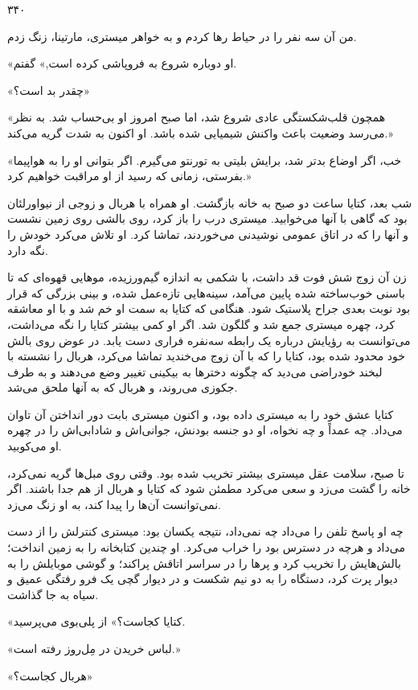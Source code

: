 ۳۴۰

من آن سه نفر را در حیاط رها کردم و به خواهر میستری، مارتینا، زنگ زدم.

«او دوباره شروع به فروپاشی کرده است,» گفتم.

«چقدر بد است؟»

«همچون قلب‌شکستگی عادی شروع شد، اما صبح امروز او بی‌حساب شد. به نظر می‌رسد وضعیت باعث واکنش شیمیایی شده باشد. او اکنون به شدت گریه می‌کند.»

«خب، اگر اوضاع بدتر شد، برایش بلیتی به تورنتو می‌گیرم. اگر بتوانی او را به هواپیما بفرستی، زمانی که رسید از او مراقبت خواهیم کرد.»

شب بعد، کتایا ساعت دو صبح به خانه بازگشت. او همراه با هربال و زوجی از نیواورلئان بود که گاهی با آنها می‌خوابید. میستری درب را باز کرد، روی بالشی روی زمین نشست و آنها را که در اتاق عمومی نوشیدنی می‌خوردند، تماشا کرد. او تلاش می‌کرد خودش را نگه دارد.

زن آن زوج شش فوت قد داشت، با شکمی به اندازه گیم‌ورزیده، موهایی قهوه‌ای که تا باسنی خوب‌ساخته شده پایین می‌آمد، سینه‌هایی تازه‌عمل شده، و بینی بزرگی که قرار بود نوبت بعدی جراح پلاستیک شود. هنگامی که کتایا به سمت او خم شد و با او معاشقه کرد، چهره میستری جمع شد و گلگون شد. اگر او کمی بیشتر کتایا را نگه می‌داشت، می‌توانست به رؤیایش درباره یک رابطه سه‌نفره فراری دست یابد. در عوض روی بالش خود محدود شده بود، کتایا را که با آن زوج می‌خندید تماشا می‌کرد، هربال را نشسته با لبخند خودراضی می‌دید که چگونه دخترها به بیکینی تغییر وضع می‌دهند و به طرف جکوزی می‌روند، و هربال که به آنها ملحق می‌شد.

کتایا عشق خود را به میستری داده بود، و اکنون میستری بابت دور انداختن آن تاوان می‌داد. چه عمداً و چه نخواه، او دو جنسه بودنش، جوانی‌اش و شادابی‌اش را در چهره او می‌کوبید.

تا صبح، سلامت عقل میستری بیشتر تخریب شده بود. وقتی روی مبل‌ها گریه نمی‌کرد، خانه را گشت می‌زد و سعی می‌کرد مطمئن شود که کتایا و هربال از هم جدا باشند. اگر نمی‌توانست آن‌ها را پیدا کند، به او زنگ می‌زد.

چه او پاسخ تلفن را می‌داد چه نمی‌داد، نتیجه یکسان بود: میستری کنترلش را از دست می‌داد و هرچه در دسترس بود را خراب می‌کرد. او چندین کتابخانه را به زمین انداخت؛ بالش‌هایش را تخریب کرد و پرها را در سراسر اتاقش پراکند؛ و گوشی موبایلش را به دیوار پرت کرد، دستگاه را به دو نیم شکست و در دیوار گچی یک فرو رفتگی عمیق و سیاه به جا گذاشت.

«کتایا کجاست؟» از پلی‌بوی می‌پرسید.

«لباس خریدن در مِل‌روز رفته است.»

«هربال کجاست؟»

